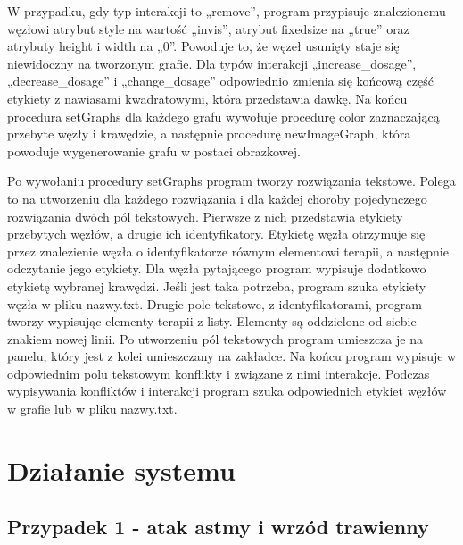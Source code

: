 \documentclass[oneside,a4paper]{book}
\begin{document}
\begin{spacing}{1.5}
W przypadku, gdy typ interakcji to „remove”, program przypisuje znalezionemu węzłowi atrybut style na wartość „invis”, atrybut fixedsize na „true” oraz atrybuty height i width na „0”. Powoduje to, że węzeł usunięty staje się niewidoczny na tworzonym grafie. Dla typów interakcji „increase\_dosage”, „decrease\_dosage” i „change\_dosage” odpowiednio zmienia się końcową część etykiety z nawiasami kwadratowymi, która przedstawia dawkę. Na końcu procedura setGraphs dla każdego grafu wywołuje procedurę color zaznaczającą przebyte węzły i krawędzie, a następnie procedurę newImageGraph, która powoduje wygenerowanie grafu w postaci obrazkowej. 

Po wywołaniu procedury setGraphs program tworzy rozwiązania tekstowe. Polega to na utworzeniu dla każdego rozwiązania i dla każdej choroby pojedynczego rozwiązania dwóch pól tekstowych. Pierwsze z nich przedstawia etykiety przebytych węzłów, a drugie ich identyfikatory. Etykietę węzła otrzymuje się przez znalezienie węzła o identyfikatorze równym elementowi terapii, a następnie odczytanie jego etykiety. Dla węzła pytającego program wypisuje dodatkowo etykietę wybranej krawędzi. Jeśli jest taka potrzeba, program szuka etykiety węzła w pliku nazwy.txt. Drugie pole tekstowe, z identyfikatorami, program tworzy wypisując elementy terapii z listy. Elementy są oddzielone od siebie znakiem nowej linii. Po utworzeniu pól tekstowych program umieszcza je na panelu, który jest z kolei umieszczany na zakładce. Na końcu program wypisuje w odpowiednim polu tekstowym konflikty i związane z nimi interakcje. Podczas wypisywania konfliktów i interakcji program szuka odpowiednich etykiet węzłów w grafie lub w pliku nazwy.txt. 

\chapter{Działanie systemu}

\section{Przypadek 1 - atak astmy i wrzód trawienny}


\end{spacing}
\end{document}
